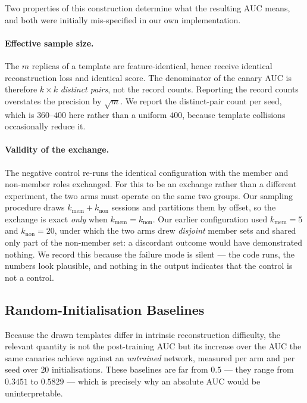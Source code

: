 Two properties of this construction determine what the resulting AUC
means, and both were initially mis-specified in our own implementation.

\paragraph{Effective sample size.} The $m$ replicas of a template are
feature-identical, hence receive identical reconstruction loss and
identical score. The denominator of the canary AUC is therefore
$k \times k$ \emph{distinct pairs}, not the record counts. Reporting the
record counts overstates the precision by $\sqrt{m}$. We report the
distinct-pair count per seed, which is $360$--$400$ here rather than a
uniform $400$, because template collisions occasionally reduce it.

\paragraph{Validity of the exchange.} The negative control re-runs the
identical configuration with the member and non-member roles exchanged.
For this to be an exchange rather than a different experiment, the two
arms must operate on the same two groups. Our sampling procedure draws
$k_{\text{mem}} + k_{\text{non}}$ sessions and partitions them by offset,
so the exchange is exact \emph{only} when
$k_{\text{mem}} = k_{\text{non}}$. Our earlier configuration used
$k_{\text{mem}} = 5$ and $k_{\text{non}} = 20$, under which the two arms
drew \emph{disjoint} member sets and shared only part of the non-member
set: a discordant outcome would have demonstrated nothing. We record this
because the failure mode is silent --- the code runs, the numbers look
plausible, and nothing in the output indicates that the control is not a
control.

\subsection{Random-Initialisation Baselines}
\label{sec:validation-baselines}

Because the drawn templates differ in intrinsic reconstruction difficulty,
the relevant quantity is not the post-training AUC but its increase over
the AUC the same canaries achieve against an \emph{untrained} network,
measured per arm and per seed over $20$ initialisations. These baselines
are far from $0.5$ --- they range from $0.3451$ to $0.5829$ --- which is
precisely why an absolute AUC would be uninterpretable.

